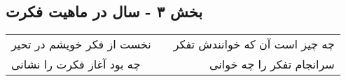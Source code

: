 \begin{center}
\section*{بخش ۳ - سال در ماهیت فکرت}
\label{sec:sh003}
\begin{longtable}{l p{0.5cm} r}
نخست از فکر خویشم در تحیر
&&
چه چیز است آن که خوانندش تفکر
\\
چه بود آغاز فکرت را نشانی
&&
سرانجام تفکر را چه خوانی
\\
\end{longtable}
\end{center}
